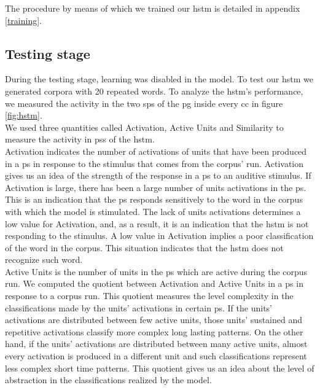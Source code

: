 \documentclass[11pt,a4paper]{article}
\begin{document}
The procedure by means of which we trained our \ac{hstm} is detailed in appendix \ref{training}.\\

\subsection{Testing stage} \label{testing}

During the testing stage, learning was disabled in the model.
To test our \ac{hstm} we generated corpora with 20 repeated words.
To analyze the \ac{hstm}'s performance, we measured the activity in the
two \ac{sp}s of the \ac{pg} inside every \ac{cc} in figure
\ref{fig:hstm}.\\

We used three quantities called Activation, Active Units and Similarity to measure the
activity in \ac{ps}s of the \ac{hstm}.\\

Activation indicates the number of activations of units that have been produced
in a \ac{ps} in response to the stimulus that comes from the corpus' run.
Activation gives us an idea of the strength of the response in a
\ac{ps} to an auditive stimulus.
If Activation is large, there has been a large number of units activations
in the \ac{ps}.
This is an indication that the \ac{ps} responds sensitively to the word in the corpus with
which the model is stimulated.
The lack of units activations determines a low value for Activation, and, as a result,
it is an indication that the \ac{hstm} is not responding to the stimulus.
A low value in Activation implies a poor classification of the word in the corpus.
This situation indicates that the \ac{hstm} does not recognize such word.\\

Active Units is the number of units in the \ac{ps} which are active during the corpus run.
We computed the quotient between Activation and Active Units
in a \ac{ps} in response to a corpus run.
This quotient measures the level complexity in the classifications made by the units'
activations in certain \ac{ps}.
If the units' activations are distributed between few active units, those units'
sustained and repetitive activations classify more complex long lasting patterns.
On the other hand, if the units' activations are distributed between many active units,
almost every activation is produced in a different unit and such classifications represent
less complex short time patterns.
This quotient gives us an idea about the level of abstraction in the classifications
realized by the model.\\
\end{document}
